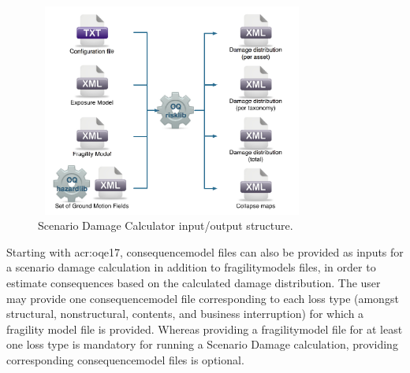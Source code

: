\begin{figure}[ht]
\centering
\includegraphics[width=9cm,height=7cm]{figures/risk/io-structure-scenario-damage.pdf}
\caption{Scenario Damage Calculator input/output structure.}
\label{fig:io-structure-scenario-damage}
\end{figure}

Starting with \glsdesc{acr:oqe17}, \gls{consequencemodel} files can also be
provided as inputs for a scenario damage calculation in addition to
\glspl{fragilitymodel} files, in order to estimate consequences based on the
calculated damage distribution. The user may provide one
\gls{consequencemodel} file corresponding to each loss type (amongst structural,
nonstructural, contents, and business interruption) for which a fragility
model file is provided. Whereas providing a \gls{fragilitymodel} file for at
least one loss type is mandatory for running a Scenario Damage calculation,
providing corresponding \gls{consequencemodel} files is optional.
